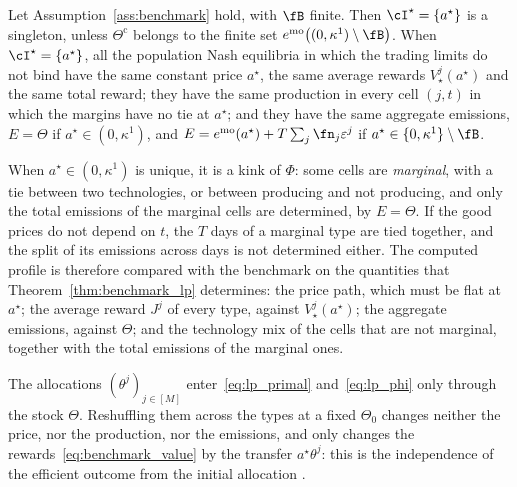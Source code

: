     \begin{corollary}[Uniqueness]
        \label{cor:benchmark_unique}
        Let Assumption~\ref{ass:benchmark} hold, with $\fB$ finite. Then $\cI^\star = \{a^\star\}$ is a singleton, unless $\Theta^{\mathrm c}$ belongs to the finite set $e^{\mathrm{mo}}\big((0, \kappa^1) \setminus \fB\big)$. When $\cI^\star = \{a^\star\}$, all the population Nash equilibria in which the trading limits do not bind have the same constant price $a^\star$, the same average rewards $V^j_\star(a^\star)$ and the same total reward; they have the same production in every cell $(j,t)$ in which the margins have no tie at $a^\star$; and they have the same aggregate emissions, $E = \Theta$ if $a^\star \in (0, \kappa^1)$, and $E = e^{\mathrm{mo}}(a^\star) + T \sum_j \fn_j \varepsilon^j$ if $a^\star \in \{0, \kappa^1\} \setminus \fB$.
    \end{corollary}

    When $a^\star \in (0, \kappa^1)$ is unique, it is a kink of $\Phi$: some cells are \emph{marginal}, with a tie between two technologies, or between producing and not producing, and only the total emissions of the marginal cells are determined, by $E = \Theta$. If the good prices do not depend on $t$, the $T$ days of a marginal type are tied together, and the split of its emissions across days is not determined either. The computed profile is therefore compared with the benchmark on the quantities that Theorem~\ref{thm:benchmark_lp} determines: the price path, which must be flat at $a^\star$; the average reward $J^j$ of every type, against $V^j_\star(a^\star)$; the aggregate emissions, against $\Theta$; and the technology mix of the cells that are not marginal, together with the total emissions of the marginal ones.

    \begin{remark}
        \label{rem:allocation_invariance}
        The allocations $(\theta^j)_{j \in [M]}$ enter~\eqref{eq:lp_primal} and~\eqref{eq:lp_phi} only through the stock $\Theta$. Reshuffling them across the types at a fixed $\Theta_0$ changes neither the price, nor the production, nor the emissions, and only changes the rewards~\eqref{eq:benchmark_value} by the transfer $a^\star \theta^j$: this is the independence of the efficient outcome from the initial allocation \citep{montgomery_markets_1972, hahn_effect_2011}.
    \end{remark}

